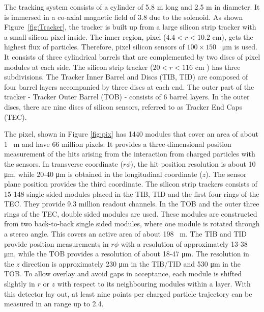 { The tracking system consists of a cylinder of 5.8 \si{ \meter} long and 2.5 \si{ \meter} in diameter. It is immersed in a co-axial magnetic field of 3.8 \si{ \Tesla} due to the solenoid.
 As shown Figure~\ref{fig:Tracker}, the tracker is built up from a large silicon strip tracker with a small silicon pixel inside. 
 The inner region, pixel ($4.4<r<10.2$ \si{ \cm}), gets the highest flux of particles. Therefore, pixel silicon sensors of $100 \times 150$ \si{ \squared \micro \meter} is used. It consists of three cylindrical barrels that are complemented by two discs of pixel modules at each side.
 The silicon strip tracker ($20<r<116$ \si{ \cm} ) has three subdivisions. The Tracker Inner Barrel  and Discs (TIB, TID) are composed of four barrel layers accompanied by three discs at each end. The outer part of the tracker - Tracker Outer Barrel (TOB) -  consists  of 6 barrel layers. In the outer discs, there are nine discs of silicon sensors, referred to as Tracker End Caps (TEC). 
  
 
 The pixel, shown in Figure \ref{fig:pix} has 1440 modules that cover an area of about 1 \si{ \squared \meter} and have 66 million pixels. It provides a three-dimensional position measurement of the hits arising from the interaction from charged particles with the sensors. In transverse coordinate ($r\phi$), the hit position resolution is about 10 \si{ \micro \meter}, while 20-40 \si{ \micro \meter} is obtained in the longitudinal coordinate ($z$). The sensor plane position provides the third coordinate. 
  The silicon strip trackers consists of 15 148 single sided modules placed in the TIB, TID and the first four rings of the TEC. They provide 9.3 million readout channels. In the TOB and the outer three rings of the TEC, double sided modules are used. These modules are constructed from two back-to-back single sided modules, where one module is rotated through a stereo angle.  This covers an active area of about 198 \si{ \squared  \meter}. The TIB and TID provide position measurements in $r\phi$ with a resolution of approximately 13-38 \si{ \micro \meter}, while the TOB provides a resolution of about 18-47 \si{ \micro \meter}. The resolution in the  $z$ direction is approximately 230  \si{ \micro \meter} in the TIB/TID and 530  \si{ \micro \meter} in the TOB. To allow overlay and avoid gaps in acceptance, each module is shifted slightly in $r$ or $z$ with respect to its neighbouring modules within a layer.  With this detector lay out, at least nine points per charged particle trajectory can be measured in an \abspsrap range up to 2.4.
  
}

